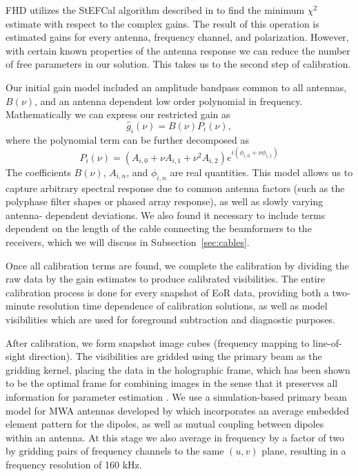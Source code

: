 \documentclass[iop]{emulateapj}
\begin{document}
FHD utilizes the StEFCal algorithm described in \citealt{Salvini:2014} to find the minimum 
$\chi^2$ estimate with respect to the complex gains. The result of this operation is 
estimated gains for every antenna, frequency channel, and polarization. However, with 
certain known properties of the antenna response we can reduce the number of free 
parameters in our solution. This takes us to the second step of calibration.

Our initial gain model included an amplitude bandpass common to all antennas, $B(\nu)$, 
and an antenna dependent low order polynomial in frequency. Mathematically we can 
express our restricted gain as
\begin{equation}\label{eq:cal1}
\hat{g}_i(\nu)=B(\nu)P_i(\nu),
\end{equation}
where the polynomial term can be further decomposed as
\begin{equation}
P_i(\nu) = (A_{i,0} + \nu A_{i,1} + \nu^2 A_{i,2})e^{i (\phi_{i,0} + \nu \phi_{i,1})}
\end{equation}
The coefficients $B(\nu)$, $A_{i,n}$, and $\phi_{i,n}$ are real quantities. This model allows 
us to capture arbitrary spectral response due to common antenna factors (such as the 
polyphase filter shapes or phased array response), as well as slowly varying antenna-
dependent deviations. We also found it necessary to include terms dependent on the 
length of the cable connecting the beamformers to the receivers, which we will discuss in Subsection~\ref{sec:cables}.

Once all calibration terms are found, we complete the calibration by dividing the raw data by 
the gain estimates to produce calibrated visibilities. The entire calibration process is done 
for every snapshot of EoR data, providing both a two-minute resolution time dependence of 
calibration solutions, as well as model visibilities which are used for foreground subtraction 
and diagnostic purposes.

After calibration, we form snapshot image cubes (frequency mapping to line-of-sight 
direction). The visibilities are gridded using the primary beam as the gridding kernel, placing 
the data in the holographic frame, which has been shown to be the optimal frame for 
combining images in the sense that it preserves all information for parameter estimation 
\citep{Morales:2009,Bhatnagar:2008}. We use a simulation-based primary beam model for MWA 
antennas developed by \citealt{Sutinjo:2015} 
which incorporates an average embedded element pattern for the dipoles, as well as mutual
coupling between dipoles within an antenna.
At this stage we also average in frequency by 
a factor of two by gridding pairs of frequency channels to the same $(u,v)$ plane, resulting in 
a frequency resolution of 160 kHz. 
\end{document}
